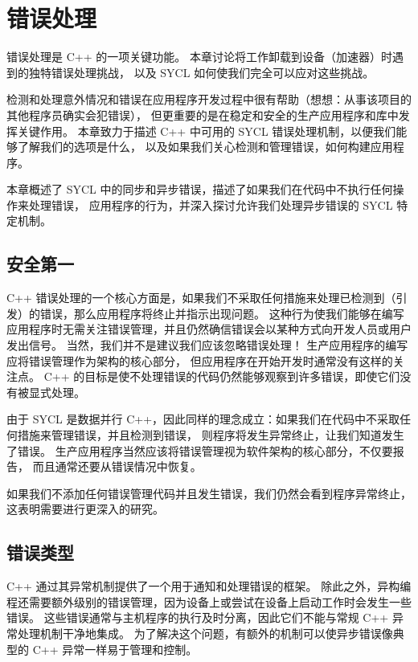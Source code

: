 \section{错误处理}
错误处理是 C++ 的一项关键功能。 本章讨论将工作卸载到设备（加速器）时遇到的独特错误处理挑战，
以及 SYCL 如何使我们完全可以应对这些挑战。

检测和处理意外情况和错误在应用程序开发过程中很有帮助（想想：从事该项目的其他程序员确实会犯错误），
但更重要的是在稳定和安全的生产应用程序和库中发挥关键作用。 
本章致力于描述 C++ 中可用的 SYCL 错误处理机制，以便我们能够了解我们的选项是什么，
以及如果我们关心检测和管理错误，如何构建应用程序。

本章概述了 SYCL 中的同步和异步错误，描述了如果我们在代码中不执行任何操作来处理错误，
应用程序的行为，并深入探讨允许我们处理异步错误的 SYCL 特定机制。


\subsection{安全第一}
C++ 错误处理的一个核心方面是，如果我们不采取任何措施来处理已检测到（引发）的错误，那么应用程序将终止并指示出现问题。 
这种行为使我们能够在编写应用程序时无需关注错误管理，并且仍然确信错误会以某种方式向开发人员或用户发出信号。 
当然，我们并不是建议我们应该忽略错误处理！ 生产应用程序的编写应将错误管理作为架构的核心部分，
但应用程序在开始开发时通常没有这样的关注点。 
C++ 的目标是使不处理错误的代码仍然能够观察到许多错误，即使它们没有被显式处理。

由于 SYCL 是数据并行 C++，因此同样的理念成立：如果我们在代码中不采取任何措施来管理错误，并且检测到错误，
则程序将发生异常终止，让我们知道发生了错误。 生产应用程序当然应该将错误管理视为软件架构的核心部分，不仅要报告，
而且通常还要从错误情况中恢复。

\begin{remark}
	如果我们不添加任何错误管理代码并且发生错误，我们仍然会看到程序异常终止，这表明需要进行更深入的研究。
\end{remark}

\subsection{错误类型}
C++ 通过其异常机制提供了一个用于通知和处理错误的框架。 
除此之外，异构编程还需要额外级别的错误管理，因为设备上或尝试在设备上启动工作时会发生一些错误。 
这些错误通常与主机程序的执行及时分离，因此它们不能与常规 C++ 异常处理机制干净地集成。 
为了解决这个问题，有额外的机制可以使异步错误像典型的 C++ 异常一样易于管理和控制。

